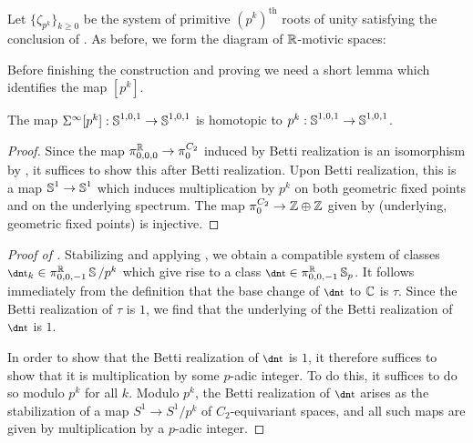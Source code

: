 Let $\{\zeta_{p^k}\}_{k \geq 0}$ be the system of primitive $(p^k)^{\mathrm{th}}$ roots of unity satisfying the conclusion of . As before, we form the diagram of $\mathbb{R}$-motivic spaces:
\begin{center}
\end{center}
Before finishing the construction and proving  we need a short lemma which identifies the map $[p^k]$.

\begin{lem}\label{lem:sus-pk}
  The map $\Sigma^\infty [p^k] : \operatorname{\mathbb{S}}^{1,0,1} \to \operatorname{\mathbb{S}}^{1,0,1}$ is homotopic to $p^k : \operatorname{\mathbb{S}}^{1,0,1} \to \operatorname{\mathbb{S}}^{1,0,1}$.
\end{lem}

\begin{proof}
  Since the map $\pi_{0,0,0} ^{\mathbb{R}} \to \pi_{0} ^{C_2}$ induced by Betti realization is an isomorphism by , it suffices to show this after Betti realization.
  Upon Betti realization, this is a map $\operatorname{\mathbb{S}}^1 \to \operatorname{\mathbb{S}}^1$ which induces multiplication by $p^k$ on both geometric fixed points and on the underlying spectrum.
   The map $\pi_0^{C_2} \to \mathbb{Z} \oplus \mathbb{Z}$ given by (underlying, geometric fixed points) is injective.
%
\end{proof}

\begin{proof}[Proof of ]
  Stabilizing and applying ,
  we obtain a compatible system of classes $\ta_k \in \pi_{0,0,-1} ^\R \Ss/p^k$
  which give rise to a class $\ta \in \pi_{0,0,-1} ^\R \Ss_p$.
  It follows immediately from the definition that the base change of $\ta$ to $\mathbb{C}$ is $\tau$.
  Since the Betti realization of $\tau$ is $1$, we find that the underlying of the Betti realization of $\ta$ is $1$. 

  In order to show that the Betti realization of $\ta$ is $1$,
  it therefore suffices to show that it is multiplication by some $p$-adic integer.
  To do this, it suffices to do so modulo $p^k$ for all $k$.
  Modulo $p^k$, the Betti realization of $\ta$ arises as the stabilization of a map $S^1 \to S^1 / p^k$ of $C_2$-equivariant spaces, and all such maps are given by multiplication by a $p$-adic integer.
\end{proof}
